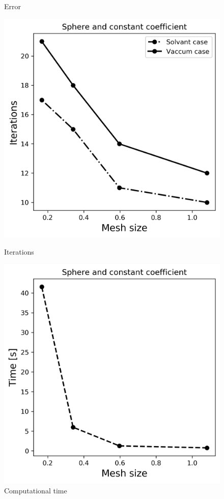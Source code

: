 \begin{itemize}
\begin{itemize}
\begin{figure}[!htb]
  \caption{Error}
\endminipage\hfill
{}
  \includegraphics[width=\linewidth]{Hybrid_FEM_BEM_Sphere_const_coeff_iter.png}
  \caption{Iterations}
\endminipage\hfill
{}%
  \includegraphics[width=\linewidth]{Hybrid_FEM_BEM_Sphere_const_coeff_time.png}
  \caption{Computational time}
\endminipage
\end{figure}
    \end{itemize}
\end{itemize}

